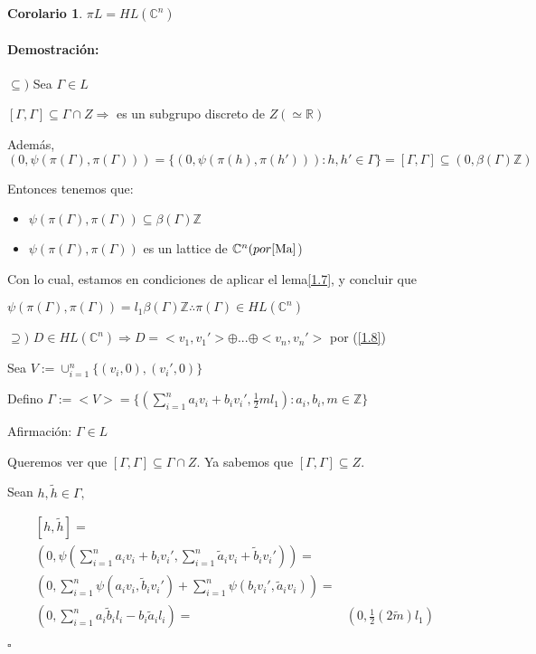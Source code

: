 \documentclass[12pt]{article}
\newtheorem{corollary}{Corolario}
\newenvironment{proof}{\paragraph{Demostración:}}{\hfill$\square$}
\begin{document}
 \begin{corollary}
  $\pi L = HL(\mathbb{C}^n)$
 \end{corollary}
 \begin{proof}
$\subseteq)$ Sea $\Gamma \in L$

$[\Gamma,\Gamma] \subseteq \Gamma \cap Z \Rightarrow$ es un subgrupo discreto de $Z (\simeq \mathbb{R})$

Además, $(0,\psi(\pi(\Gamma),\pi(\Gamma))) = \{(0,\psi(\pi(h),\pi(h'))): h,h' \in \Gamma\} = [\Gamma,\Gamma] \subseteq (0,\beta(\Gamma) \mathbb{Z})$

Entonces tenemos que:
\begin{itemize}
 \item $\psi(\pi(\Gamma),\pi(\Gamma)) \subseteq \beta(\Gamma) \mathbb{Z}$
 \item $\psi(\pi(\Gamma),\pi(\Gamma))$ es un lattice de $\mathbb{C}^n (por \cite{Ma}$)
\end{itemize}

Con lo cual, estamos en condiciones de aplicar el lema\ref{1.7}, y concluir que 

$\psi(\pi(\Gamma),\pi(\Gamma))=l_1 \beta(\Gamma) \mathbb{Z} \therefore \pi(\Gamma) \in HL(\mathbb{C}^n) $
\newline

$\supseteq)$ $D\in HL(\mathbb{C}^n) \Rightarrow D=<v_1,v_1'>\oplus ... \oplus <v_n,v_n'>$ por (\ref{1.8}) 

Sea  $V:= \cup_{i=1}^n \{(v_i,0),(v_i',0)\}$

Defino $\Gamma := <V>=\{(\sum_{i=1}^n a_i v_i + b_i v_i', \frac{1}{2} m l_1):a_i,b_i,m \in \mathbb{Z} \}$
\newline

Afirmación: $\Gamma \in L$

Queremos ver que $[\Gamma,\Gamma] \subseteq \Gamma \cap Z.  $
Ya sabemos que $[\Gamma,\Gamma] \subseteq Z.$

Sean $h,\tilde{h} \in \Gamma,$

$$ \begin{aligned}
\left[ h ,\tilde{h} \right] =&\\
(0,\psi(\sum_{i=1}^n a_i v_i + b_i v_i',\sum_{i=1}^n \tilde{a}_i v_i + \tilde{b}_i v_i'))=&\\
(0,\sum_{i=1}^n \psi(a_i v_i ,\tilde{b}_i v_i') + \sum_{i=1}^n \psi( b_i v_i',\tilde{a}_i v_i ))=&\\
(0,\sum_{i=1}^n a_i \tilde{b}_i l_i - b_i \tilde{a}_i l_i)=& (0,\frac{1}{2} (2 \tilde{m})l_1 )
\end{aligned}$$


\end{proof}
\end{document}
